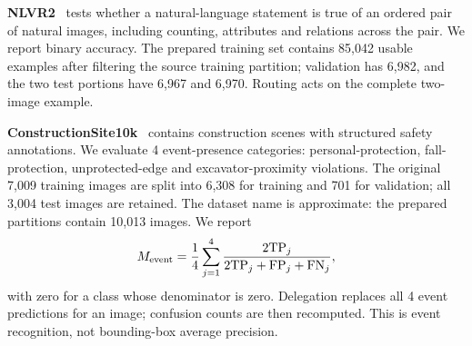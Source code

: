 \textbf{NLVR2}~\cite{nlvr2} tests whether a natural-language statement is true of an ordered pair of natural images, including counting, attributes and relations across the pair. We report binary accuracy. The prepared training set contains 85,042 usable examples after filtering the source training partition; validation has 6,982, and the two test portions have 6,967 and 6,970. Routing acts on the complete two-image example.

\textbf{ConstructionSite10k}~\cite{construction} contains construction scenes with structured safety annotations. We evaluate 4 event-presence categories: personal-protection, fall-protection, unprotected-edge and excavator-proximity violations. The original 7,009 training images are split into 6,308 for training and 701 for validation; all 3,004 test images are retained. The dataset name is approximate: the prepared partitions contain 10,013 images. We report
\begin{equation}
M_{\rm event}=\frac14\sum_{j=1}^4
\frac{2\mathrm{TP}_j}{2\mathrm{TP}_j+\mathrm{FP}_j+\mathrm{FN}_j},
\label{eq:f1}
\end{equation}
with zero for a class whose denominator is zero. Delegation replaces all 4 event predictions for an image; confusion counts are then recomputed. This is event recognition, not bounding-box average precision.

